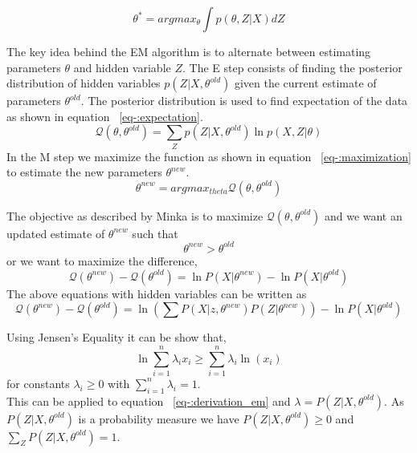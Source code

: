 \documentclass[12pt]{dalcsthesis}
\begin{document}
\begin{equation}
\label{eq-:em_description}
\theta^{*}=arg max_{\theta} \int p(\theta,Z|X)dZ
\end{equation}

The key idea behind the EM algorithm is to alternate between estimating parameters $\theta$ and hidden variable $Z$.
The E step consists of finding the posterior distribution of hidden variables $p(Z|X,\theta^{old})$ given the current estimate of parameters $\theta^{old}$.
The posterior distribution is used to find expectation of the data as shown in equation ~\ref{eq-:expectation}. 
\begin{equation}
\label{eq-:expectation}
\mathcal{Q}(\theta,\theta^{old})=\sum_{Z}p(Z|X,\theta^{old}) \ln p(X,Z|\theta)
\end{equation}
In the M step we maximize the function as shown in equation ~\ref{eq-:maximization} to estimate the new parameters $\theta^{new}$.
\begin{equation}
\label{eq-:maximization}
\theta^{new}=arg max_{theta} \mathcal{Q}(\theta,\theta^{old})
\end{equation}

The objective as described by Minka \cite{minka1998expectation} is to maximize $\mathcal{Q}(\theta,\theta^{old})$ and we want an updated estimate of $\theta^{new}$ such that 
\begin{equation}
\theta^{new}>\theta^{old}
\end{equation}
or we want to maximize the difference,
\begin{equation}
\mathcal{Q}(\theta^{new})-\mathcal{Q}(\theta^{old})=\ln P(X|\theta^{new}) - \ln P(X|\theta^{old})
\end{equation}
The above equations with hidden variables can be written as
\begin{equation}
\label{eq-:derivation_em}
\mathcal{Q}(\theta^{new})-\mathcal{Q}(\theta^{old})=\ln(\sum P(X|z,\theta^{new}) P(Z|\theta^{new})) - \ln P(X|\theta^{old})
\end{equation}

Using Jensen's Equality it can be show that,
\begin{equation}
\ln \sum_{i=1}^{n}\lambda_{i}x_{i} \geq \sum_{i=1}^{n}\lambda_{i}\ln(x_{i})
\end{equation}
for constants $\lambda_{i} \geq 0$ with $\sum_{i=1}^{n}\lambda_{i}=1$. 
\\
This can be applied to equation ~\ref{eq-:derivation_em} and $\lambda=P(Z|X,\theta^{old})$. As $P(Z|X,\theta^{old})$ is a probability measure we have $P(Z|X,\theta^{old}) \geq 0$ and $\sum_{Z}P(Z|X,\theta^{old})=1$.
\end{document}
